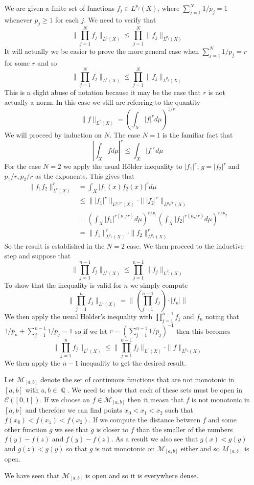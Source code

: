 \documentclass{article}
\DeclareMathOperator{\Q}{\mathbb{Q}}
\newcommand{\exercise}[1]{\noindent{\textbf{Exercise #1:}}}
\newcommand{\norm}[1]{\|#1\|}
\begin{document}
\exercise{1.8.16} We are given a finite set of functions $f_j \in
L^{p_j}(X)$, where $\sum_{j=1}^N 1/p_j = 1$ whenever $p_j \geq 1$ for
each $j$. We need to verify that
\[
\norm{\prod_{j=1}^N f_j}_{L^1(X)} \leq \prod_{j=1}^N \norm{f_j}_{L^{p_j}(X)}
\]
It will actually we be easier to prove the more general case when
$\sum_{j=1}^N 1/p_j = r$ for some $r$ and so
\[
\norm{\prod_{j=1}^N f_j}_{L^r(X)} \leq \prod_{j=1}^N \norm{f_j}_{L^{p_j}(X)}
\]
This is a slight abuse of notation because it may be the case that $r$
is not actually a norm. In this case we still are referring to the
quantity
\[
\norm{f}_{L^r(X)} = \left(\int_X|f|^rd\mu\right)^{1/r}
\]
We will proceed by induction on $N$. The case $N = 1$ is the familiar
fact that
\[
\left|\int_X fd\mu\right|^r \leq \int_X|f|^rd\mu
\]
For the case $N=2$ we apply the usual H\"{o}lder inequality to
$|f_1|^r$, $g = |f_2|^r$ and $p_1/r, p_2/r$ as the exponents. This
gives that
\begin{align*}
  \norm{f_1f_2}_{L^r(X)}^r &= \int_X |f_1(x)f_2(x)|^rd\mu \\
  &\leq \norm{|f_1|^r}_{L^{p_1/r}(X)}\cdot\norm{|f_2|^r}_{L^{p_2/r}(X)} \\
  &= \left(\int_X |f_1|^{r(p_1/r)}d\mu\right)^{r/p_1}\left(\int_X
    |f_2|^{r(p_2/r)}d\mu\right)^{r/p_2} \\
  &= \norm{f_1}_{L^{p_1}(X)}^r\cdot\norm{f_2}_{L^{p_2}(X)}^r
\end{align*}
So the result is established in the $N=2$ case. We then proceed to the
inductive step and suppose that
\[
\norm{\prod_{j=1}^{n-1} f_j}_{L^r(X)} \leq \prod_{j=1}^{n-1}
\norm{f_j}_{L^{p_j}(X)}
\]
To show that the inequality is valid for $n$ we simply compute
\[
\norm{\prod_{j=1}^{n} f_j}_{L^1(X)} = \norm{(\prod_{j=1}^{n-1} f_j)\cdot|f_n|}
\]
We then apply the usual H\"{o}lder's inequality with
$\prod_{j=1}^{n-1} f_j$ and $f_n$ noting that $1/p_n +
\sum_{j=1}^{n-1} 1/p_j = 1$ so if we let $r = \left(\sum_{j=1}^{n-1}
  1/p_j\right)^{-1}$ then this becomes
\[
\norm{\prod_{j=1}^{n} f_j}_{L^1(X)} \leq \norm{\prod_{j=1}^{n-1}
  f_j}_{L^r(X)}\cdot\norm{f}_{L^{p_n}(X)}
\]
We then apply the $n-1$ inequality to get the desired result.

\exercise{4.6.11}

Let $\mathcal{M}_{[a,b]}$ denote the set of continuous functions that
are not monotonic in $[a,b]$ with $a,b \in \Q$. We need to show that
each of these sets must be open in $\mathcal{C}([0,1])$. If we choose
an $f \in \mathcal{M}_{[a,b]}$ then it measn that $f$ is not monotonic
in $[a,b]$ and therefore we can find points $x_0 < x_1 < x_2$ such
that $f(x_0) < f(x_1) < f(x_2)$. If we compute the distance between
$f$ and some other function $g$ we see that $g$ is closer to $f$ than
the smaller of the numbers $f(y) - f(z)$ and $f(y) - f(z)$. As a
result we also see that $g(x) < g(y)$ and $g(z) < g(y)$ so that $g$ is
not monotonic on $\mathcal{M}_{[a,b]}$ either and so $M_{[a,b]}$ is open.

We have seen that $\mathcal{M}_{[a,b]}$ is open and so it is
everywhere dense. 
\end{document}
